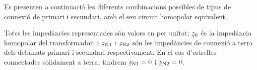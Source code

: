 Es presenten a continuació les diferents combinacions possibles de tipus de connexió de primari i secundari, amb el seu circuit homopolar equivalent.

Totes les impedàncies representades són valors en per unitat; $\cmplx{z}_0$ és la impedància homopolar del transformador, i $\cmplx{z}\ped{N1}$ i $\cmplx{z}\ped{N2}$ són les impedàncies de connexió a terra dels debanats primari i secundari respectivament. En el cas d'estrelles connectades sòlidament a terra, tindrem $\cmplx{z}\ped{N1}=0$ i $\cmplx{z}\ped{N2}=0$.

\begin{center}
    
\end{center}


\begin{center}
    
\end{center}


\begin{center}
    
\end{center}


\begin{center}
    
\end{center}


\begin{center}
    
\end{center}


\begin{center}
    
\end{center}


\begin{center}
    
\end{center}


\begin{center}
    
\end{center}


